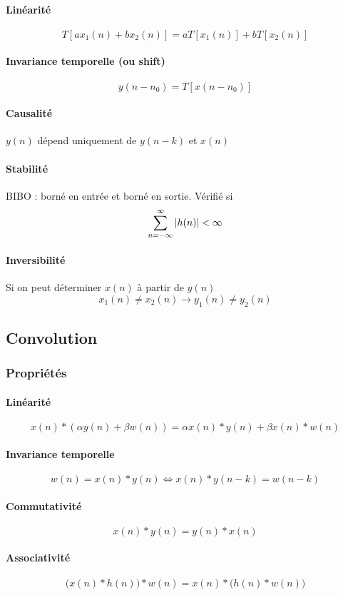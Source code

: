 \documentclass[resume]{subfiles}
\begin{document}
\paragraph{Linéarité}
$$T\left[ax_1(n)+bx_2(n)\right]=aT\left[x_1(n)\right]+bT\left[x_2(n)\right]$$
\paragraph{Invariance temporelle (ou shift)}
$$y(n-n_0)=T\left[x(n-n_0)\right]$$
\paragraph{Causalité}
$y(n)$ dépend uniquement de $y(n-k)$ et $x(n)$
\paragraph{Stabilité}
BIBO : borné en entrée et borné en sortie. Vérifié si
$$\sum_{n=-\infty}^{\infty}\abs{h(n)} < \infty$$
\paragraph{Inversibilité}
Si on peut déterminer $x(n)$ à partir de $y(n)$
$$x_1(n)\neq x_2(n)\longrightarrow y_1(n)\neq y_2(n)$$
\subsection{Convolution}
\subsubsection{Propriétés}
\paragraph{Linéarité}
$$x(n)*(\alpha y(n)+\beta w(n))=\alpha x(n)*y(n) + \beta x(n)*w(n)$$
\paragraph{Invariance temporelle}
$$w(n)=x(n)*y(n)\Longleftrightarrow x(n)*y(n-k)=w(n-k)$$
\paragraph{Commutativité}
$$x(n)*y(n)=y(n)*x(n)$$
\paragraph{Associativité}
$$\Big(x(n)*h(n)\Big)*w(n)=x(n)*\Big(h(n)*w(n)\Big)$$
\end{document}
